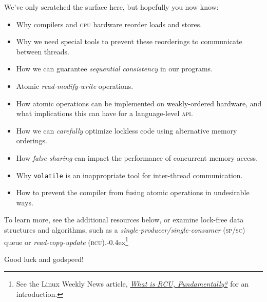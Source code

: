 \documentclass[fontsize=10pt, numbers=endperiod]{scrartcl}
\newcommand{\punckern}{\kern-0.4ex}
\newcommand{\monobox}[1]{\mbox{\texttt{#1}}}
\newcommand{\keyword}[1]{\monobox{\color{darkGreen}#1}}
\newcommand{\introduce}[1]{\textit{#1}}
\begin{document}
\begin{multicols}{2}
We've only scratched the surface here,
but hopefully you now know:
\begin{itemize}
\item Why compilers and \textsc{cpu} hardware reorder loads and stores.
\item Why we need special tools to prevent these reorderings
    to communicate between threads.
\item How we can guarantee \introduce{sequential consistency} in our programs.
\item Atomic \introduce{read-modify-write} operations.
\item How atomic operations can be implemented on weakly-ordered hardware,
    and what implications this can have for a language-level \textsc{api}.
\item How we can \emph{carefully} optimize lockless code using alternative
    memory orderings.
\item How \introduce{false sharing} can impact the performance of
    concurrent memory access.
\item Why \keyword{volatile} is an inappropriate tool for inter-thread
    communication.
\item How to prevent the compiler from fusing atomic operations in undesirable
    ways.
\end{itemize}
To learn more, see the additional resources below,
or examine lock-free data structures and algorithms,
such as a \introduce{single-producer/single-consumer}
\textsc{(sp/sc)} queue or \introduce{read-copy-update}
\textsc{(rcu)}.\punckern\footnote{See the Linux Weekly News article,
\href{https://lwn.net/Articles/262464/}{\textit{What is RCU, Fundamentally?}}
for an introduction.}

\vspace{\baselineskip}
\noindent Good luck and godspeed!
\end{multicols}
\newpage

\appendix
\setcounter{secnumdepth}{0}
\setfootnoterule{0pt}
\end{document}
